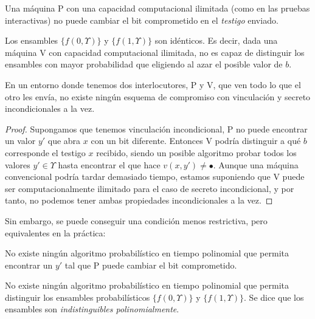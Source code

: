 \begin{definition}
	Una máquina P con una capacidad computacional ilimitada (como en las pruebas interactivas) no puede cambiar el bit comprometido en el \textit{testigo} enviado.
\end{definition}

\begin{definition}
	Los ensambles $\{f(0,\Upsilon)\}$ y $\{f(1,\Upsilon)\}$ son idénticos. Es decir, dada una máquina V con capacidad computacional ilimitada, no es capaz de distinguir los ensambles con mayor probabilidad que eligiendo al azar el posible valor de $b$.
\end{definition}

\begin{proposition}
	En un entorno donde tenemos dos interlocutores, P y V, que ven todo lo que el otro les envía, no existe ningún esquema de compromiso con vinculación y secreto incondicionales a la vez.
\end{proposition}

\begin{proof}
	Supongamos que tenemos vinculación incondicional, P no puede encontrar un valor $y'$ que abra $x$ con un bit diferente. Entonces V podría distinguir a qué $b$ corresponde el testigo $x$ recibido, siendo un posible algoritmo probar todos los valores $y'\in \Upsilon$ hasta encontrar el que hace $ v(x,y') \neq \bullet$. Aunque una máquina convencional podría tardar demasiado tiempo, estamos suponiendo que V puede ser computacionalmente ilimitado para el caso de secreto incondicional, y por tanto, no podemos tener ambas propiedades incondicionales a la vez.
\end{proof}

Sin embargo, se puede conseguir una condición menos restrictiva, pero equivalentes en la práctica:

\begin{definition}
	No existe ningún algoritmo probabilístico en tiempo polinomial que permita encontrar un $y'$ tal que P puede cambiar el bit comprometido.
\end{definition}

\begin{definition}
	No existe ningún algoritmo probabilístico en tiempo polinomial que permita distinguir los ensambles probabilísticos $\{f(0,\Upsilon)\}$ y $\{f(1,\Upsilon)\}$. Se dice que los ensambles son \textit{indistinguibles polinomialmente}.
\end{definition}


